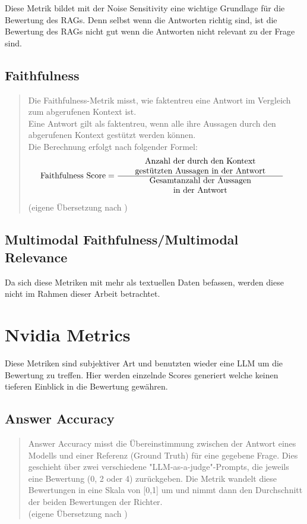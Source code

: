 Diese Metrik bildet mit der Noise Sensitivity eine wichtige Grundlage für die Bewertung des RAGs.
Denn selbst wenn die Antworten richtig sind, ist die Bewertung des RAGs nicht gut wenn die Antworten nicht relevant zu der Frage sind.

\subsection{Faithfulness}
\begin{quote}
Die Faithfulness-Metrik misst, wie faktentreu eine Antwort im Vergleich zum abgerufenen Kontext ist.\\

Eine Antwort gilt als faktentreu, wenn alle ihre Aussagen durch den abgerufenen Kontext gestützt werden können.\\

Die Berechnung erfolgt nach folgender Formel:
\begin{align}
  \text{Faithfulness Score} 
    &= \frac{
        \parbox{7cm}{\centering Anzahl der durch den Kontext\\ gestützten Aussagen in der Antwort}
      }{
        \parbox{7cm}{\centering Gesamtanzahl der Aussagen\\ in der Antwort}
      }
  \end{align}

(eigene Übersetzung nach \cite{ragas_faithfulness})
\end{quote}
\subsection{Multimodal Faithfulness/Multimodal Relevance}
Da sich diese Metriken mit mehr als textuellen Daten befassen, werden diese nicht im Rahmen dieser Arbeit betrachtet.


\section{Nvidia Metrics}
Diese Metriken sind subjektiver Art und benutzten wieder eine LLM um die Bewertung zu treffen.
Hier werden einzelnde Scores generiert welche keinen tieferen Einblick in die Bewertung gewähren.

\subsection{Answer Accuracy}
\begin{quote}
Answer Accuracy misst die Übereinstimmung zwischen der Antwort eines Modells und einer Referenz (Ground Truth) für eine gegebene Frage. Dies geschieht über zwei verschiedene "LLM-as-a-judge"-Prompts, die jeweils eine Bewertung (0, 2 oder 4) zurückgeben. Die Metrik wandelt diese Bewertungen in eine Skala von [0,1] um und nimmt dann den Durchschnitt der beiden Bewertungen der Richter.
\\
(eigene Übersetzung nach \cite{ragas_nvidia_metrics})
\end{quote}

